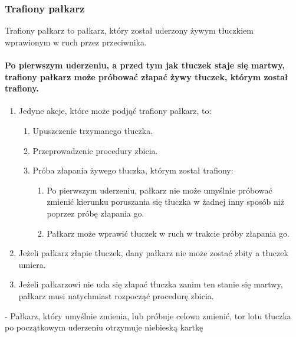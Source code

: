 \documentclass[12pt]{article}
\newcommand\bluecard{\bgroup\color{blue}\markoverwith{\textcolor{blue}{\rule[-0.5ex]{2pt}{0.4pt}}}\ULon}
\begin{document}
\subsubsection{Trafiony pałkarz}

Trafiony pałkarz to pałkarz, który został uderzony żywym tłuczkiem
wprawionym w ruch przez przeciwnika.

\paragraph{Po pierwszym uderzeniu, a przed tym jak tłuczek staje
	się martwy, trafiony pałkarz może próbować złapać żywy tłuczek, którym
	został trafiony.}

\begin{enumerate}
	\item
	      Jedyne akcje, które może podjąć trafiony pałkarz, to:

	      \begin{enumerate}
		      \item
		            Upuszczenie trzymanego tłuczka.
		      \item
		            Przeprowadzenie procedury zbicia.
		      \item
		            Próba złapania żywego tłuczka, którym został trafiony:

		            \begin{enumerate}
			            \item
			                  Po pierwszym uderzeniu, pałkarz nie może umyślnie próbować zmienić
			                  kierunku poruszania się tłuczka w żadnej inny sposób niż poprzez
			                  próbę złapania go.
			            \item
			                  Pałkarz może wprawić tłuczek w ruch w trakcie próby złapania go.
		            \end{enumerate}
	      \end{enumerate}
	\item
	      Jeżeli pałkarz złapie tłuczek, dany pałkarz nie może zostać zbity a
	      tłuczek umiera.
	\item
	      Jeżeli pałkarzowi nie uda się złapać tłuczka zanim ten stanie się
	      martwy, pałkarz musi natychmiast rozpocząć procedurę zbicia.
\end{enumerate}

\bluecard{Niebieska kartka} - Pałkarz, który umyślnie zmienia, lub próbuje
celowo zmienić, tor lotu tłuczka po początkowym uderzeniu otrzymuje
niebieską kartkę
\end{document}
